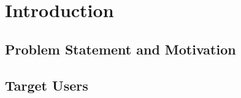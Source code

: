 \section{Introduction}
\label{sec:Introduction}


\subsection{Problem Statement and Motivation}

\subsection{Target Users}
